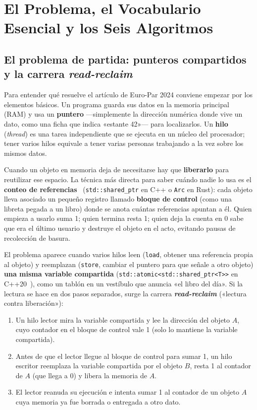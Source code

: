 \documentclass[11pt,a4paper]{article}
\begin{document}
\newpage
\tableofcontents
\newpage

\section{El Problema, el Vocabulario Esencial y los Seis Algoritmos}

\subsection{El problema de partida: punteros compartidos y la carrera \emph{read-reclaim}}
Para entender qué resuelve el artículo de Euro-Par 2024 conviene empezar por los elementos básicos. Un programa guarda sus datos en la memoria principal (RAM) y usa un \textbf{puntero} —simplemente la dirección numérica donde vive un dato, como una ficha que indica «estante 42»— para localizarlos. Un \textbf{hilo} (\emph{thread}) es una tarea independiente que se ejecuta en un núcleo del procesador; tener varios hilos equivale a tener varias personas trabajando a la vez sobre los mismos datos.

Cuando un objeto en memoria deja de necesitarse hay que \textbf{liberarlo} para reutilizar ese espacio. La técnica más directa para saber cuándo nadie lo usa es el \textbf{conteo de referencias}~\cite{collins1960refcount} (\texttt{std::shared\_ptr} en C++ o \texttt{Arc} en Rust): cada objeto lleva asociado un pequeño registro llamado \textbf{bloque de control} (como una libreta pegada a un libro) donde se anota cuántas referencias apuntan a él. Quien empieza a usarlo suma 1; quien termina resta 1; quien deja la cuenta en 0 sabe que era el último usuario y destruye el objeto en el acto, evitando pausas de recolección de basura.

El problema aparece cuando varios hilos leen (\texttt{load}, obtener una referencia propia al objeto) y reemplazan (\texttt{store}, cambiar el puntero para que señale a otro objeto) \textbf{una misma variable compartida} (\texttt{std::atomic<std::shared\_ptr<T>>} en C++20~\cite{sutter2014atomic}), como un tablón en un vestíbulo que anuncia «el libro del día». Si la lectura se hace en dos pasos separados, surge la carrera \textbf{\emph{read-reclaim}} («lectura contra liberación»):

\begin{enumerate}
  \item Un hilo lector mira la variable compartida y lee la dirección del objeto $A$, cuyo contador en el bloque de control vale 1 (solo lo mantiene la variable compartida).
  \item Antes de que el lector llegue al bloque de control para sumar 1, un hilo escritor reemplaza la variable compartida por el objeto $B$, resta 1 al contador de $A$ (que llega a 0) y libera la memoria de $A$.
  \item El lector reanuda su ejecución e intenta sumar 1 al contador de un objeto $A$ cuya memoria ya fue borrada o entregada a otro dato.
\end{enumerate}
\end{document}

